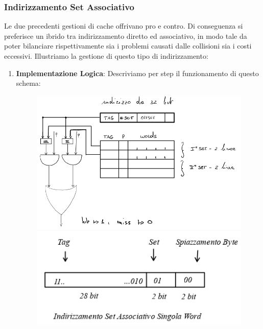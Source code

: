 \documentclass{article}
\begin{document}
\newpage

\subsubsection{Indirizzamento Set Associativo}

Le due precedenti gestioni di cache offrivano pro e contro. Di conseguenza si preferisce un ibrido tra indirizzamento diretto ed associativo, in modo tale da poter bilanciare rispettivamente sia i problemi causati dalle collisioni sia i costi eccessivi. Illustriamo la gestione di questo tipo di indirizzamento:

\begin{enumerate}
    \item \textbf{Implementazione Logica}: Descriviamo per step il funzionamento di questo schema:

    
\begin{figure}[H]
  \centering
  \begin{minipage}[b]{0.4\textwidth}
    \includegraphics[width=\textwidth]{img/ind_set_associativo_logico.png}
  \end{minipage}
  \hspace{10px}
  \begin{minipage}[b]{0.4\textwidth}
    \includegraphics[width=\textwidth]{img/indirizzamento_diretto_indirizzi2.png}
  \end{minipage}
\end{figure}


\end{enumerate}
\end{document}
